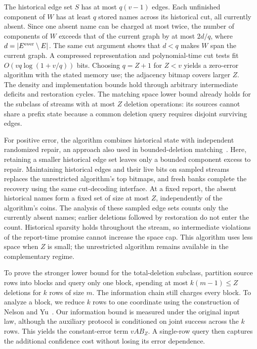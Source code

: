 \documentclass[11pt,letterpaper]{article}
\numberwithin{equation}{section}
\begin{document}
The historical edge set $S$ has at most $q(v-1)$ edges.
Each unfinished component of $W$ has at least $q$ stored names across its historical cut, all currently absent.
Since one absent name can be charged at most twice, the number of components of $W$ exceeds that of the current graph by at most $2d/q$, where $d=|E^{\rm ever}\setminus E|$.
The same cut argument shows that $d<q$ makes $W$ span the current graph.
A compressed representation and polynomial-time cut tests fit $O(vq\log(1+v/q))$ bits.
Choosing $q=Z+1$ for $Z<v$ yields a zero-error algorithm with the stated memory use; the adjacency bitmap covers larger $Z$.
The density and implementation bounds hold through arbitrary intermediate deficits and restoration cycles.
The matching space lower bound already holds for the subclass of streams with at most $Z$ deletion operations: its sources cannot share a prefix state because a common deletion query requires disjoint surviving edges.

For positive error, the algorithm combines historical state with independent randomized repair, an approach also used in bounded-deletion matching~\cite{KKD2025}.
Here, retaining a smaller historical edge set leaves only a bounded component excess to repair.
Maintaining historical edges and their live bits on sampled streams replaces the unrestricted algorithm's top bitmaps, and fresh banks complete the recovery using the same cut-decoding interface.
At a fixed report, the absent historical names form a fixed set of size at most $Z$, independently of the algorithm's coins.
The analysis of these sampled edge sets counts only the currently absent names; earlier deletions followed by restoration do not enter the count.
Historical sparsity holds throughout the stream, so intermediate violations of the report-time promise cannot increase the space cap.
This algorithm uses less space when $Z$ is small; the unrestricted algorithm remains available in the complementary regime.

To prove the stronger lower bound for the total-deletion subclass, partition source rows into blocks and query only one block, spending at most $k(m-1)\le Z$ deletions for $k$ rows of size $m$.
The information chain still charges every block.
To analyze a block, we reduce $k$ rows to one coordinate using the construction of Nelson and Yu~\cite[Lemma~3]{NelsonYu2019}.
Our information bound is measured under the original input law, although the auxiliary protocol is conditioned on joint success across the $k$ rows.
This yields the constant-error term $vAB_Z$.
A single-row query then captures the additional confidence cost without losing its error dependence.
\end{document}

